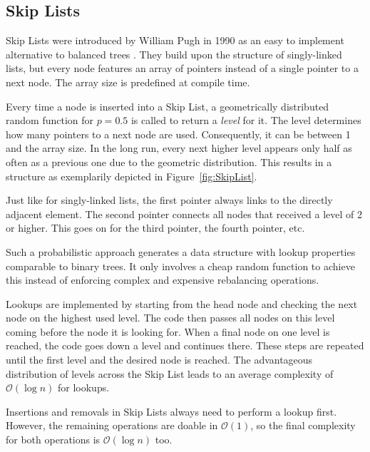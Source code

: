 \subsection{Skip Lists}
Skip Lists were introduced by William Pugh in 1990 as an easy to implement alternative to balanced trees \cite{pugh1990skiplists}.
They build upon the structure of singly-linked lists, but every node features an array of pointers instead of a single pointer to a next node.
The array size is predefined at compile time.

Every time a node is inserted into a Skip List, a geometrically distributed random function for $p = 0.5$ is called to return a \emph{level} for it.
The level determines how many pointers to a next node are used.
Consequently, it can be between 1 and the array size.
In the long run, every next higher level appears only half as often as a previous one due to the geometric distribution.
This results in a structure as exemplarily depicted in Figure~\ref{fig:SkipList}.

Just like for singly-linked lists, the first pointer always links to the directly adjacent element.
The second pointer connects all nodes that received a level of 2 or higher.
This goes on for the third pointer, the fourth pointer, etc.

Such a probabilistic approach generates a data structure with lookup properties comparable to binary trees.
It only involves a cheap random function to achieve this instead of enforcing complex and expensive rebalancing operations.

Lookups are implemented by starting from the head node and checking the next node on the highest used level.
The code then passes all nodes on this level coming before the node it is looking for.
When a final node on one level is reached, the code goes down a level and continues there.
These steps are repeated until the first level and the desired node is reached.
The advantageous distribution of levels across the Skip List leads to an average complexity of $\mathcal{O}(\log n)$ for lookups.

Insertions and removals in Skip Lists always need to perform a lookup first.
However, the remaining operations are doable in $\mathcal{O}(1)$, so the final complexity for both operations is $\mathcal{O}(\log n)$ too.

